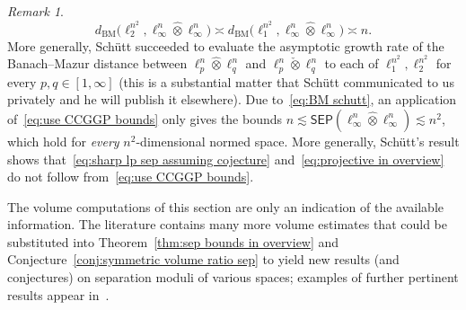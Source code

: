 \documentclass[11pt,reqno]{amsart}
\theoremstyle{remark}
\newtheorem{remark}[theorem]{Remark}
\newcommand{\BM}{\mathrm{BM}}
\renewcommand{\1}{\mathbf 1}
\newcommand{\sep}{\mathsf{SEP}}
\newcommand{\tp}{\hat{\otimes}}
\newcommand{\ti}{\check{\otimes}}
\begin{document}
\begin{remark}
\begin{equation}\label{eq:BM schutt}
d_{\BM}\big(\ell_2^{n^2},\ell_\infty^n\tp \ell_\infty^n\big)\asymp d_{\BM}\big(\ell_1^{n^2},\ell_\infty^n\tp \ell_\infty^n\big)\asymp n.
\end{equation}
More generally, Sch\"utt succeeded to evaluate the asymptotic growth rate of the Banach--Mazur distance between $\ell_p^n\tp\ell_q^n$ and $\ell_p^n\ti\ell_q^n$ to each of  $\ell_1^{n^2}, \ell_2^{n^2}$ for every $p,q\in [1,\infty]$ (this is a substantial matter that Sch\"utt communicated to us privately and he will publish it elsewhere).
Due to~\eqref{eq:BM schutt}, an application of~\eqref{eq:use CCGGP bounds} only gives the bounds $n\lesssim \sep(\ell_\infty^n\tp\ell_\infty^n)\lesssim n^2$, which hold for {\em every} $n^2$-dimensional normed space. More generally, Sch\"utt's result shows that~\eqref{eq:sharp lp sep assuming cojecture} and~\eqref{eq:projective in overview} do not follow from~\eqref{eq:use CCGGP bounds}.
\end{remark}




The volume computations of this section are only an indication of the available information. The literature contains many more volume estimates that could be substituted into Theorem~\ref{thm:sep bounds in overview}  and Conjecture~\ref{conj:symmetric volume ratio sep}  to yield new results (and conjectures)  on separation moduli of various spaces; examples of further pertinent results appear in~\cite{Sch82,Bal91-gl,GJ97,GJN97,GJ99,GP99,GPSTW17,DP09,DV20,KP20,KPT20}.
\end{document}
